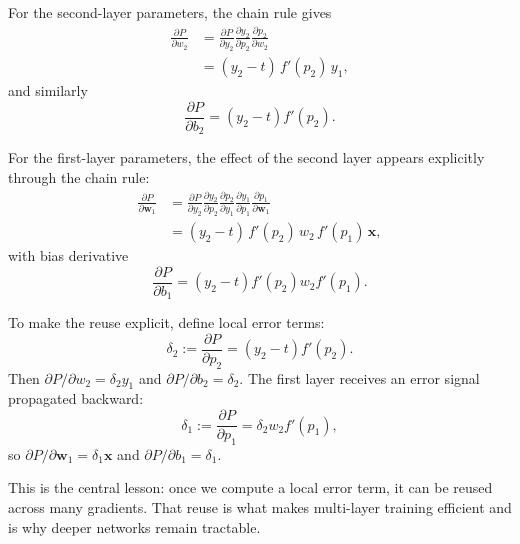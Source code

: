 For the second-layer parameters, the chain rule gives
\begin{equation}
\begin{aligned}
\frac{\partial P}{\partial w_2}
&= \frac{\partial P}{\partial y_2}\frac{\partial y_2}{\partial p_2}\frac{\partial p_2}{\partial w_2} \\
&= (y_2 - t)\, f'(p_2)\, y_1,
\end{aligned}
\label{eq:grad_w2}
\end{equation}
and similarly
\begin{equation}
\frac{\partial P}{\partial b_2} = (y_2 - t) f'(p_2).
\label{eq:grad_b2}
\end{equation}

For the first-layer parameters, the effect of the second layer appears explicitly through the chain rule:
\begin{equation}
\begin{aligned}
\frac{\partial P}{\partial \mathbf{w}_1}
&= \frac{\partial P}{\partial y_2}\frac{\partial y_2}{\partial p_2}\frac{\partial p_2}{\partial y_1}\frac{\partial y_1}{\partial p_1}\frac{\partial p_1}{\partial \mathbf{w}_1} \\
&= (y_2 - t)\, f'(p_2)\, w_2\, f'(p_1)\, \mathbf{x},
\end{aligned}
\label{eq:grad_w1}
\end{equation}
with bias derivative
\begin{equation}
\frac{\partial P}{\partial b_1} = (y_2 - t) f'(p_2) w_2 f'(p_1).
\label{eq:grad_b1}
\end{equation}

\smallskip
\noindent To make the reuse explicit, define local error terms:
\begin{equation}
\delta_2:= \frac{\partial P}{\partial p_2} = (y_2 - t) f'(p_2).
\label{eq:delta2}
\end{equation}
Then $\partial P/\partial w_2 = \delta_2 y_1$ and $\partial P/\partial b_2=\delta_2$. The first layer receives an error signal propagated backward:
\begin{equation}
\delta_1:= \frac{\partial P}{\partial p_1} = \delta_2 w_2 f'(p_1),
\label{eq:delta1}
\end{equation}
so $\partial P/\partial \mathbf{w}_1 = \delta_1 \mathbf{x}$ and $\partial P/\partial b_1 = \delta_1$.

This is the central lesson: once we compute a local error term, it can be reused across many gradients. That reuse is what makes multi-layer training efficient and is why deeper networks remain tractable.

